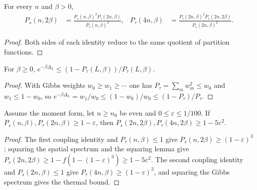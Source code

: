 \begin{lemma}[Coupling]\label{lem:purity_coupling}
    \leanok
    For every $n$ and $\beta>0$,
    \begin{align}
        P_s(n,2\beta)     & =\frac{P_s(n,\beta)^2P_\tau(2n,\beta)}{P_\tau(n,\beta)^2},
                          &
        P_\tau(4n,\beta) & =\frac{P_\tau(2n,\beta)^2P_s(2n,2\beta)}{P_s(2n,\beta)^2}.
    \end{align}
\end{lemma}

\begin{proof}
    \leanok
    Both sides of each identity reduce to the same quotient of partition
    functions.
\end{proof}

\begin{lemma}\label{lem:purity_gap_bound}
    \leanok
    For $\beta\ge0$, $e^{-\beta\Delta_L}\le(1-P_\tau(L,\beta))/P_\tau(L,\beta)$.
\end{lemma}

\begin{proof}
    \leanok
    With Gibbs weights $w_0\ge w_1\ge\cdots$ one has
    $P_\tau=\sum_mw_m^2\le w_0$ and $w_1\le1-w_0$, so
    $e^{-\beta\Delta_L}=w_1/w_0\le(1-w_0)/w_0\le(1-P_\tau)/P_\tau$.
\end{proof}

\begin{lemma}[Doubling]\label{lem:purity_doubling}
    \leanok
    Assume the moment form, let $n\ge n_0$ be even and $0\le\varepsilon\le1/100$.
    If $P_s(n,\beta),P_\tau(2n,\beta)\ge1-\varepsilon$, then
    $P_s(2n,2\beta),P_\tau(4n,2\beta)\ge1-5\varepsilon^2$.
\end{lemma}

\begin{proof}
    \leanok
    The first coupling identity and $P_\tau(n,\beta)\le1$ give
    $P_s(n,2\beta)\ge(1-\varepsilon)^3$; squaring the spatial spectrum and the
    squaring lemma give $P_s(2n,2\beta)\ge1-f(1-(1-\varepsilon)^3)\ge1-5\varepsilon^2$.
    The second coupling identity and $P_s(2n,\beta)\le1$ give
    $P_\tau(4n,\beta)\ge(1-\varepsilon)^3$, and squaring the Gibbs spectrum
    gives the thermal bound.
\end{proof}

